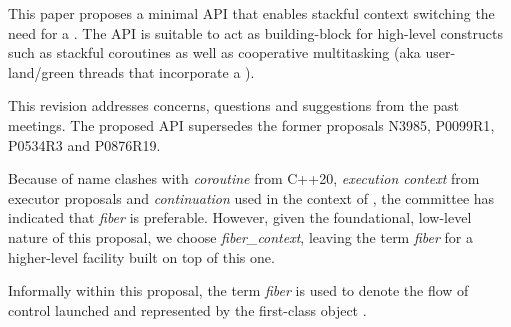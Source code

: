 \label{abstract}

This paper proposes a
minimal API that enables stackful context switching  the need for a
. The API is suitable to act as building-block for high-level
constructs such as stackful coroutines as well as cooperative multitasking
(aka user-land/green threads that incorporate a ).

This revision addresses concerns, questions and suggestions from the past meetings.
The proposed API supersedes the former proposals N3985\cite{N3985},
P0099R1\cite{P0099R1}, P0534R3\cite{P0534R3} and P0876R19\cite{P0876R19}.

Because of name clashes with \emph{coroutine} from C++20,
\emph{execution context} from executor proposals and \emph{continuation} used
in the context of , the committee has indicated
that \emph{fiber} is preferable. However, given the foundational, low-level
nature of this proposal, we choose \emph{fiber\_context}, leaving the
term \emph{fiber} for a higher-level facility built on top of this one.

Informally within this proposal, the term \emph{fiber} is used to denote the
flow of control launched and represented by the first-class object \fiber.
